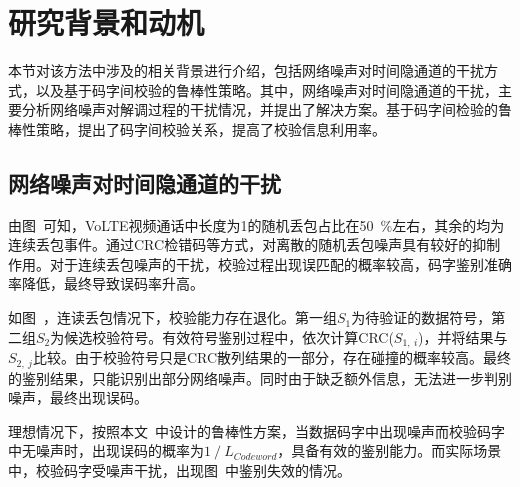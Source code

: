 \section{研究背景和动机}
\label{chap:hash:motivation}

本节对该方法中涉及的相关背景进行介绍，包括网络噪声对时间隐通道的干扰方式，以及基于码字间校验的鲁棒性策略。其中，网络噪声对时间隐通道的干扰，主要分析网络噪声对解调过程的干扰情况，并提出了解决方案。基于码字间检验的鲁棒性策略，提出了码字间校验关系，提高了校验信息利用率。

\subsection{网络噪声对时间隐通道的干扰}
\label{chap:hash:motivation:noise}

由图\ 可知，VoLTE视频通话中长度为1的随机丢包占比在{50\ \%}左右，其余的均为连续丢包事件。通过CRC检错码等方式，对离散的随机丢包噪声具有较好的抑制作用。对于连续丢包噪声的干扰，校验过程出现误匹配的概率较高，码字鉴别准确率降低，最终导致误码率升高。


如图\ ，连读丢包情况下，校验能力存在退化。第一组$S_{1}$为待验证的数据符号，第二组$S_{2}$为候选校验符号。有效符号鉴别过程中，依次计算CRC($S_{1,\ i}$)，并将结果与$S_{2,\ j}$比较。由于校验符号只是CRC散列结果的一部分，存在碰撞的概率较高。最终的鉴别结果，只能识别出部分网络噪声。同时由于缺乏额外信息，无法进一步判别噪声，最终出现误码。

理想情况下，按照本文\ 中设计的鲁棒性方案，当数据码字中出现噪声而校验码字中无噪声时，出现误码的概率为$1\ /\ L_{Codeword}$，具备有效的鉴别能力。而实际场景中，校验码字受噪声干扰，出现图\ 中鉴别失效的情况。

